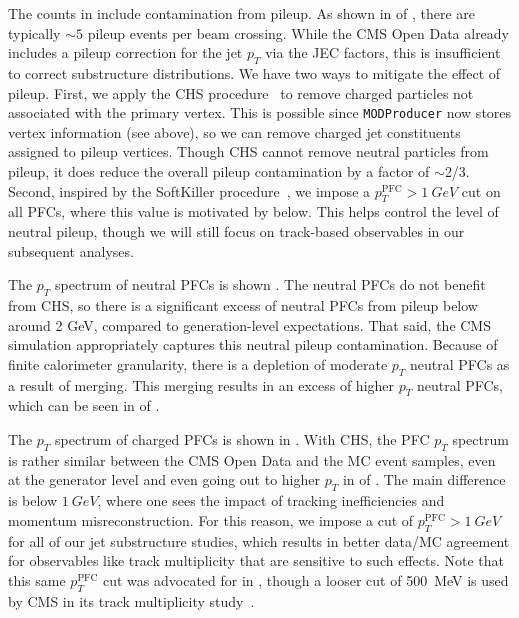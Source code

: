 \documentclass[aps,prd,twocolumn,preprintnumbers,nofootinbib,longbibliography,floatfix,superscriptaddress]{revtex4-1}
\begin{document}
The counts in  include contamination from pileup.
%
As shown in  of , there are typically $\sim 5$ pileup events per beam crossing.
%
While the CMS Open Data already includes a pileup correction for the jet $p_T$ via the JEC factors, this is insufficient to correct substructure distributions.
%
We have two ways to mitigate the effect of pileup.
%
First, we apply the CHS procedure~\cite{CMS:2014ata} to remove charged particles not associated with the primary vertex.
%
This is possible since \texttt{MODProducer} now stores vertex information (see  above), so we can remove charged jet constituents assigned to pileup vertices.
%
Though CHS cannot remove neutral particles from pileup, it does reduce the overall pileup contamination by a factor of $\sim$2/3.
%
Second, inspired by the SoftKiller procedure~\cite{Cacciari:2014gra}, we impose a $p_T^\text{PFC} > \SI{1}{GeV}$ cut on all PFCs, where this value is motivated by  below.
%
This helps control the level of neutral pileup, though we will still focus on track-based observables in our subsequent analyses.


The $p_T$ spectrum of neutral PFCs is shown .
%
The neutral PFCs do not benefit from CHS, so there is a significant excess of neutral PFCs from pileup below around 2 GeV, compared to generation-level expectations.
%
That said, the CMS simulation appropriately captures this neutral pileup contamination.
%
Because of finite calorimeter granularity, there is a depletion of moderate $p_T$ neutral PFCs as a result of merging.
%
This merging results in an excess of higher $p_T$ neutral PFCs, which can be seen in  of .


The $p_T$ spectrum of charged PFCs is shown in .
%
With CHS, the PFC $p_T$ spectrum is rather similar between the CMS Open Data and the MC event samples, even at the generator level and even going out to higher $p_T$ in  of .
%
The main difference is below $\SI{1}{GeV}$, where one sees the impact of tracking inefficiencies and momentum misreconstruction.
%
For this reason, we impose a cut of $p_T^\text{PFC} > \SI{1}{GeV}$ for all of our jet substructure studies, which results in better data/MC agreement for observables like track multiplicity that are sensitive to such effects. 
%
Note that this same $p_T^\text{PFC}$ cut was advocated for in , though a looser cut of \SI{500}{MeV} is used by CMS in its track multiplicity study~\cite{Chatrchyan:2012mec}.
\end{document}
